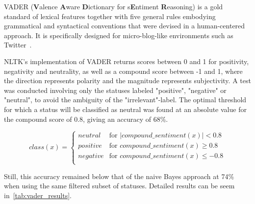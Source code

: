 VADER (\textbf{V}alence \textbf{A}ware \textbf{D}ictionary for s\textbf{E}ntiment \textbf{R}easoning)
is a gold standard of lexical features together with five general rules embodying grammatical and syntactical conventions
that were devised in a human-centered approach.
It is specifically designed for micro-blog-like environments such as Twitter~\cite{Hutto2014}.

NLTK's implementation of VADER returns scores between 0 and 1 for positivity, negativity and neutrality,
as well as a compound score between -1 and 1, where the direction represents polarity and the magnitude represents subjectivity.
A test was conducted involving only the statuses labeled "positive", "negative" or "neutral",
to avoid the ambiguity of the "irrelevant"-label.
The optimal threshold for which a status will be classified as neutral was found
at an absolute value for the compound score of 0.8, giving an accuracy of 68\%.

\begin{equation}
    class(x) =
    \begin{cases}
        neutral & \text{for } |compound\_sentiment(x)| < 0.8 \\
        positive & \text{for } compound\_sentiment(x) \geq 0.8 \\
        negative & \text{for } compound\_sentiment(x) \leq -0.8 \\
    \end{cases}
\end{equation}

Still, this accuracy remained below that of the naive Bayes approach at 74\% when using the same filtered subset of statuses.
Detailed results can be seem in~\cref{tab:vader_results}.

